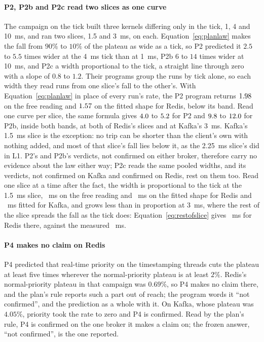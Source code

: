 \documentclass[10pt,journal,onecolumn]{IEEEtran}
\newcommand{\kafka}{Kafka}
\newcommand{\redis}{Redis}
\begin{document}
\paragraph{P2, P2b and P2c read two slices as one curve} The campaign on the tick built three
kernels differing only in the tick, 1, 4 and 10~ms, and ran two slices, 1.5 and 3~ms, on each.
Equation~\ref{eq:planlaw} makes the fall from $90\%$ to $10\%$ of the plateau as wide as a tick,
so P2 predicted it $2.5$ to $5.5$ times wider at the 4~ms tick than at 1~ms, P2b $6$ to $14$ times
wider at 10~ms, and P2c a width proportional to the tick, a straight line through zero with a
slope of $0.8$ to $1.2$. Their programs group the runs by tick alone, so each width they read
runs from one slice's fall to the other's. With Equation~\ref{eq:planlaw} in place of every run's
rate, the P2 program returns $1.98$ on the free reading and
$1.57$ on the fitted shape for \redis{}, below its band. Read one curve per
slice, the same formula gives $4.0$ to $5.2$ for P2 and
$9.8$ to $12.0$ for P2b, inside both bands, at both of \redis{}'s
slices and at \kafka{}'s 3~ms. \kafka{}'s 1.5~ms slice is the exception: no trip can be shorter
than the client's own with nothing added, and most of that slice's fall lies below it, as the
2.25~ms slice's did in L1. P2's and P2b's verdicts, not confirmed on either broker, therefore
carry no evidence about the law either way; P2c reads the same pooled widths,
and its verdicts, not confirmed on \kafka{} and confirmed on \redis{}, rest on them too. Read one
slice at a time after the fact, the width is
proportional to the tick at the 1.5~ms slice, \cliffLineRedisShortFree~ms on the free reading
and \cliffLineRedisShortFitted~ms on the fitted shape for \redis{} and
\cliffLineKafkaShortFitted~ms fitted for \kafka{}, and grows less than in proportion at 3~ms,
where the rest of the slice spreads the fall as the tick does: Equation~\ref{eq:restofslice}
gives \cliffLineRedisLongRest~ms for \redis{} there, against the measured
\cliffLineRedisLongFitted~ms.

\paragraph{P4 makes no claim on \redis{}} P4 predicted that real-time priority on the
timestamping threads cuts the plateau at least five times wherever the normal-priority plateau is at
least $2\%$. \redis{}'s normal-priority plateau in that campaign was $0.69\%$, so P4 makes no claim
there, and the plan's rule reports such a part out of reach; the program words it ``not
confirmed'', and the prediction as a whole with it. On \kafka{}, whose plateau was $4.05\%$,
priority took the rate to zero and P4 is confirmed. Read by the plan's rule, P4 is confirmed on
the one broker it makes a claim on; the frozen answer, ``not confirmed'', is the one reported.
\end{document}
